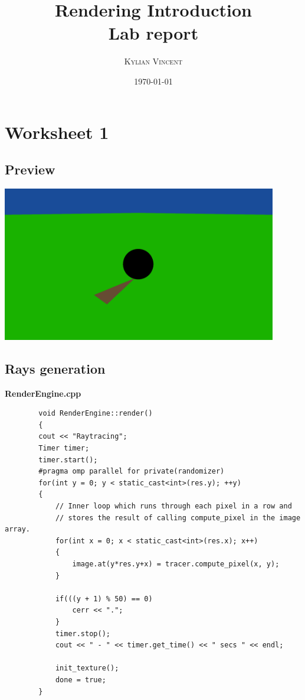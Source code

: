 \documentclass[a4,12pt]{article}
\title{\textbf{Rendering Introduction\\Lab report}}
\author{
	\begin{tabular}{c}
		\textsc{Kylian Vincent}\\
	\end{tabular}}
\date{\small \today}
\begin{document}
	\maketitle

	\tableofcontents
	\pagebreak
	
	\section{Worksheet 1}
	
	\subsection{Preview}
	\begin{center}
		\includegraphics[width = 12cm]{./Worksheet1/Worksheet1_GettingStarted_Cropped.png}
	\end{center}
	
	\subsection{Rays generation}
	\textbf{RenderEngine.cpp}
	\begin{lstlisting}
		void RenderEngine::render()
		{
		cout << "Raytracing";
		Timer timer;
		timer.start();
		#pragma omp parallel for private(randomizer)
		for(int y = 0; y < static_cast<int>(res.y); ++y)
		{
			// Inner loop which runs through each pixel in a row and
			// stores the result of calling compute_pixel in the image array.
			for(int x = 0; x < static_cast<int>(res.x); x++)
			{
				image.at(y*res.y+x) = tracer.compute_pixel(x, y);
			}
		
			if(((y + 1) % 50) == 0) 
				cerr << ".";
			}
			timer.stop();
			cout << " - " << timer.get_time() << " secs " << endl;
		
			init_texture();
			done = true;
		}
	\end{lstlisting}
	
\end{document}
